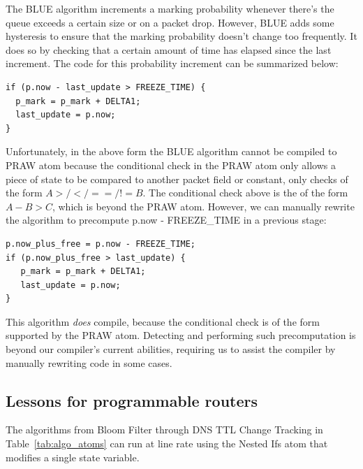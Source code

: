 The BLUE algorithm increments a marking probability whenever there's the queue
exceeds a certain size or on a packet drop. However, BLUE adds some hysteresis
to ensure that the marking probability doesn't change too frequently. It does
so by checking that a certain amount of time has elapsed since the last
increment. The code for this probability increment can be summarized below:

\begin{verbatim}
if (p.now - last_update > FREEZE_TIME) {
  p_mark = p_mark + DELTA1;
  last_update = p.now;
}
\end{verbatim}

Unfortunately, in the above form the BLUE algorithm cannot be compiled to PRAW
atom because the conditional check in the PRAW atom only allows a piece of
state to be compared to another packet field or constant, \ie only checks of
the form $A >/</==/!= B$. The conditional check above is the of the form $A - B
> C$, which is beyond the PRAW atom. However, we can manually rewrite the algorithm
to precompute p.now - FREEZE\_TIME in a previous stage:

\begin{verbatim}
p.now_plus_free = p.now - FREEZE_TIME;
if (p.now_plus_free > last_update) {
   p_mark = p_mark + DELTA1;
   last_update = p.now;
}
\end{verbatim}

This algorithm {\em does} compile, because the conditional check is of the form
supported by the PRAW atom. Detecting and performing such precomputation is
beyond our compiler's current abilities, requiring us to assist the compiler by
manually rewriting code in some cases. 
 

\subsection{Lessons for programmable routers}
\label{ss:lessons}

 The algorithms from Bloom Filter through DNS TTL Change Tracking
in Table~\ref{tab:algo_atoms} can run at line rate using the Nested Ifs atom that
modifies a single state variable.

